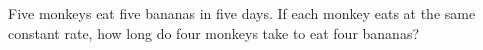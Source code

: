 Five monkeys eat five bananas in five days. If each monkey eats at the same constant rate, how long do four monkeys take to eat four bananas?
